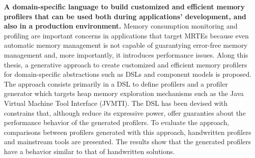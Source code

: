 \textbf{A domain-specific language to build customized and efficient memory profilers that can be used both during applications' development, and also in a production environment.}
Memory consumption monitoring and profiling are important concerns in applications that target MRTEs because even automatic memory management is not capable of guarantying error-free memory management and, more importantly, it introduces performance issues.
Along this thesis, a generative approach to create customized and efficient memory profilers for domain-specific abstractions such as DSLs and component models is proposed.
The approach consists primarily in a DSL to define profilers and a profiler generator which targets heap memory exploration mechanisms such as the Java Virtual Machine Tool Interface (JVMTI).
The DSL has been devised with constrains that, although reduce its expressive power, offer guaranties about the performance behavior of the generated profilers.
To evaluate the approach, comparisons between profilers generated with this approach, handwritten profilers and mainstream tools are presented.
The results show that the generated profilers have a behavior similar to that of handwritten solutions.


\begin{comment}


\section{Structure of the thesis}

\end{comment}
